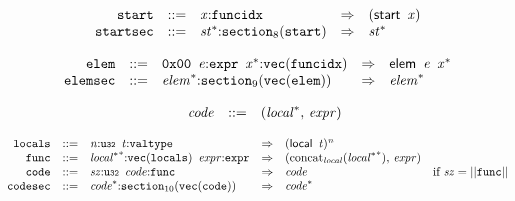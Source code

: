 \vspace{1ex}

$$
\begin{array}{@{}l@{}rrlll@{}l@{}}
& {\mathtt{start}} &::=& {\mathit{x}}{:}{\mathtt{funcidx}} &\Rightarrow& (\mathsf{start}~\,{\mathit{x}}) \\
& {\mathtt{startsec}} &::=& {{\mathit{st}}^\ast}{:}{{\mathtt{section}}}_{8}({\mathtt{start}}) &\Rightarrow& {{\mathit{st}}^\ast} \\
\end{array}
$$

\vspace{1ex}

$$
\begin{array}{@{}l@{}rrlll@{}l@{}}
& {\mathtt{elem}} &::=& \mathtt{0x00}~\,{\mathit{e}}{:}{\mathtt{expr}}~\,{{\mathit{x}}^\ast}{:}{\mathtt{vec}}({\mathtt{funcidx}}) &\Rightarrow& \mathsf{elem}~\,{\mathit{e}}~\,{{\mathit{x}}^\ast} \\
& {\mathtt{elemsec}} &::=& {{\mathit{elem}}^\ast}{:}{{\mathtt{section}}}_{9}({\mathtt{vec}}({\mathtt{elem}})) &\Rightarrow& {{\mathit{elem}}^\ast} \\
\end{array}
$$

\vspace{1ex}

$$
\begin{array}{@{}lrrl@{}l@{}}
& {\mathit{code}} &::=& ({{\mathit{local}}^\ast},\, {\mathit{expr}}) \\
\end{array}
$$

$$
\begin{array}{@{}l@{}rrlll@{}l@{}}
& {\mathtt{locals}} &::=& {\mathit{n}}{:}{\mathtt{u{\scriptstyle32}}}~\,{\mathit{t}}{:}{\mathtt{valtype}} &\Rightarrow& {(\mathsf{local}~\,{\mathit{t}})^{{\mathit{n}}}} \\
& {\mathtt{func}} &::=& {{{\mathit{local}}^\ast}^\ast}{:}{\mathtt{vec}}({\mathtt{locals}})~\,{\mathit{expr}}{:}{\mathtt{expr}} &\Rightarrow& ({{\mathrm{concat}}}_{{\mathit{local}}}({{{\mathit{local}}^\ast}^\ast}),\, {\mathit{expr}}) \\
& {\mathtt{code}} &::=& {\mathit{sz}}{:}{\mathtt{u{\scriptstyle32}}}~\,{\mathit{code}}{:}{\mathtt{func}} &\Rightarrow& {\mathit{code}} &\quad
  \mbox{if}~{\mathit{sz}} = ||{\mathtt{func}}|| \\
& {\mathtt{codesec}} &::=& {{\mathit{code}}^\ast}{:}{{\mathtt{section}}}_{10}({\mathtt{vec}}({\mathtt{code}})) &\Rightarrow& {{\mathit{code}}^\ast} \\
\end{array}
$$

